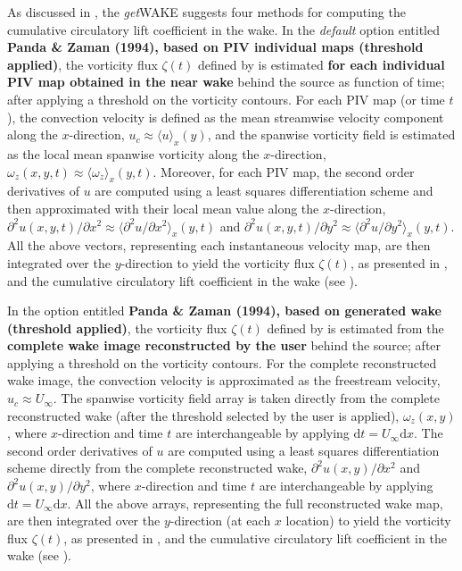 \documentclass[12pt,a4paper]{article}
\begin{document}
As discussed in , the \textit{get}WAKE suggests four methods for computing the cumulative circulatory lift coefficient in the wake. 
In the \textit{default} option entitled \textbf{Panda \& Zaman (1994), based on PIV individual maps (threshold applied)}, the vorticity flux $\zeta(t)$ defined by  is estimated \textbf{for each individual PIV map obtained in the near wake} behind the source as function of time; after applying a threshold on the vorticity contours. 
For each PIV map (or time $t$), the convection velocity is defined as the mean streamwise velocity component along the $x$-direction, $u_c\approx\langle{u}\rangle_x(y)$, and the spanwise vorticity field is estimated as the local mean spanwise vorticity along the $x$-direction, $\omega_z(x,y,t)\approx\langle{\omega_z}\rangle_x(y,t)$. 
Moreover, for each PIV map, the second order derivatives of $u$ are computed using a least squares differentiation scheme and then approximated with their local mean value along the $x$-direction, $\partial^2u(x,y,t)/\partial x^2\approx\langle{\partial^2u/\partial x^2}\rangle_x(y,t)$ and $\partial^2u(x,y,t)/\partial y^2\approx\langle{\partial^2u/\partial y^2}\rangle_x(y,t)$.
All the above vectors, representing each instantaneous velocity map, are then integrated over the $y$-direction to yield the vorticity flux $\zeta(t)$, as presented in , and the cumulative circulatory lift coefficient in the wake (see ).

In the option entitled \textbf{Panda \& Zaman (1994), based on generated wake (threshold applied)}, the vorticity flux $\zeta(t)$ defined by  is estimated from the \textbf{complete wake image reconstructed by the user} behind the source; after applying a threshold on the vorticity contours. 
For the complete reconstructed wake image, the convection velocity is approximated as the freestream velocity, $u_c\approx U_\infty$. The spanwise vorticity field array is taken directly from the complete reconstructed wake (after the threshold selected by the user is applied), $\omega_z(x,y)$, where $x$-direction and time $t$ are interchangeable by applying $\mathrm{d}t=U_\infty\mathrm{d}x$.
The second order derivatives of $u$ are computed using a least squares differentiation scheme directly from the complete reconstructed wake, $\partial^2u(x,y)/\partial x^2$ and $\partial^2u(x,y)/\partial y^2$, where $x$-direction and time $t$ are interchangeable by applying $\mathrm{d}t=U_\infty\mathrm{d}x$.
All the above arrays, representing the full reconstructed wake map, are then integrated over the $y$-direction (at each $x$ location) to yield the vorticity flux $\zeta(t)$, as presented in , and the cumulative circulatory lift coefficient in the wake (see ).
\end{document}
